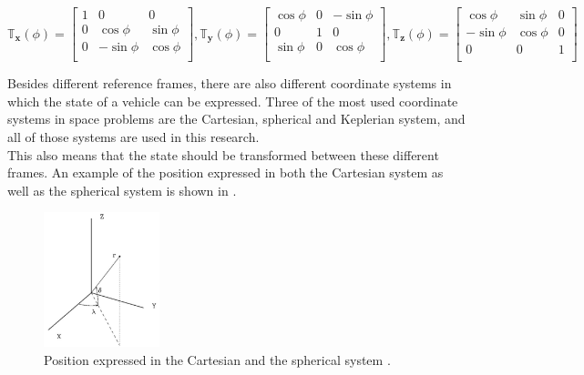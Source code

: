 \begin{equation} \label{eq:allTransMatr}
\mathbb{T}_{\mathbf{x}}(\phi)=\begin{bmatrix}
1 & 0 & 0 \\
0 & \cos\phi & \sin\phi \\
0 & -\sin\phi & \cos\phi \\
\end{bmatrix}, 
\mathbb{T}_{\mathbf{y}}(\phi)=\begin{bmatrix}
\cos\phi & 0 & -\sin\phi \\
0 & 1 & 0\\
\sin\phi & 0 & \cos\phi \\
\end{bmatrix}, 
\mathbb{T}_{\mathbf{z}}(\phi)=\begin{bmatrix}
\cos\phi & \sin\phi & 0\\
- \sin\phi & \cos\phi & 0\\
0 & 0 & 1\\
\end{bmatrix}
\end{equation}


\noindent
Besides different reference frames, there are also different coordinate systems in which the state of a vehicle can be expressed. Three of the most used coordinate systems in space problems are the Cartesian, spherical and Keplerian system, and all of those systems are used in this research.\\ 
This also means that the state should be transformed between these different frames. An example of the position expressed in both the Cartesian system as well as the spherical system is shown in .


\begin{figure}[H]
\centering
\includegraphics[width=0.3\textwidth]{figures/reference_frames/sphertocart_noomen2013basic.jpg}
\caption{Position expressed in the Cartesian and the spherical system \cite{noomen2013basic}.}
\label{fig:sphertocart_noomen2013basicFirst}
\end{figure}

